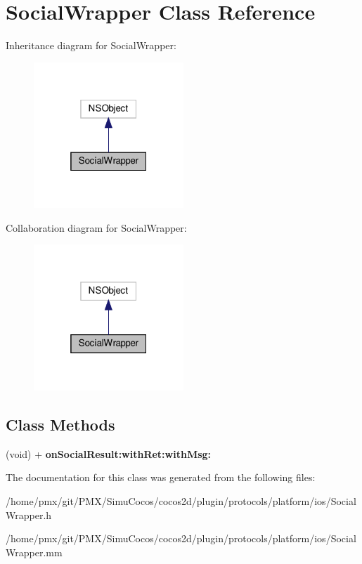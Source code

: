 \hypertarget{interfaceSocialWrapper}{}\section{Social\+Wrapper Class Reference}
\label{interfaceSocialWrapper}


Inheritance diagram for Social\+Wrapper\+:
\nopagebreak
\begin{figure}[H]
\begin{center}
\leavevmode
\includegraphics[width=160pt]{interfaceSocialWrapper__inherit__graph}
\end{center}
\end{figure}


Collaboration diagram for Social\+Wrapper\+:
\nopagebreak
\begin{figure}[H]
\begin{center}
\leavevmode
\includegraphics[width=160pt]{interfaceSocialWrapper__coll__graph}
\end{center}
\end{figure}
\subsection*{Class Methods}
\begin{DoxyCompactItemize}
\item 
\mbox{\label{interfaceSocialWrapper_acefff8a3bb7e578772ca593115eccef8}} 
(void) + {\bfseries on\+Social\+Result\+:with\+Ret\+:with\+Msg\+:}
\end{DoxyCompactItemize}


The documentation for this class was generated from the following files\+:\begin{DoxyCompactItemize}
\item 
/home/pmx/git/\+P\+M\+X/\+Simu\+Cocos/cocos2d/plugin/protocols/platform/ios/Social\+Wrapper.\+h\item 
/home/pmx/git/\+P\+M\+X/\+Simu\+Cocos/cocos2d/plugin/protocols/platform/ios/Social\+Wrapper.\+mm\end{DoxyCompactItemize}
